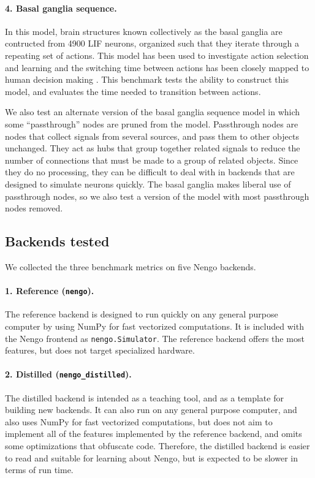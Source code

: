 \documentclass{frontiersSCNS}
\begin{document}
\paragraph{4. Basal ganglia sequence.}
In this model, brain structures
known collectively as the basal ganglia
are contructed from 4900 LIF neurons,
organized such that they iterate
through a repeating set of actions.
This model has been used to investigate
action selection and learning \citep{stewart2012a}
and the switching time between actions
has been closely mapped to human decision making
\citep{stewart2010}.
This benchmark tests the ability
to construct this model,
and evaluates the time needed
to transition between actions.

We also test an alternate version
of the basal ganglia sequence model
in which some ``passthrough'' nodes
are pruned from the model.
Passthrough nodes are nodes
that collect signals from several sources,
and pass them to other objects unchanged.
They act as hubs
that group together related signals
to reduce the number of connections
that must be made to
a group of related objects.
Since they do no processing,
they can be difficult to deal with
in backends that are designed to
simulate neurons quickly.
The basal ganglia makes liberal use
of passthrough nodes,
so we also test a version of the model
with most passthrough nodes removed.

\subsection{Backends tested}

We collected the three benchmark metrics
on five Nengo backends.

\paragraph{1. Reference (\texttt{nengo}).}
The reference backend is designed to run quickly
on any general purpose computer
by using NumPy \citep{vanderwalt2011}
for fast vectorized computations.
It is included with the Nengo frontend
as \texttt{nengo.Simulator}.
The reference backend offers
the most features, but does not target
specialized hardware.

\paragraph{2. Distilled (\texttt{nengo\_distilled}).}
The distilled backend is intended as a teaching tool,
and as a template for building new backends.
It can also run on any general purpose computer,
and also uses NumPy for fast vectorized computations,
but does not aim to implement all of the features
implemented by the reference backend,
and omits some optimizations that obfuscate code.
Therefore, the distilled backend is easier to read
and suitable for learning about Nengo,
but is expected to be slower in terms of run time.
\end{document}
